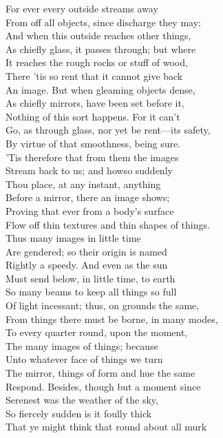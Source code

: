 For ever every outside streams away\\
From off all objects, since discharge they may;\\
And when this outside reaches other things,\\
As chiefly glass, it passes through; but where\\
It reaches the rough rocks or stuff of wood,\\
There 'tis so rent that it cannot give back\\
An image. But when gleaming objects dense,\\
As chiefly mirrors, have been set before it,\\
Nothing of this sort happens. For it can't\\
Go, as through glass, nor yet be rent—its safety,\\
By virtue of that smoothness, being sure.\\
'Tis therefore that from them the images\\
Stream back to us; and howso suddenly\\
Thou place, at any instant, anything\\
Before a mirror, there an image shows;\\
Proving that ever from a body's surface\\
Flow off thin textures and thin shapes of things.\\
Thus many images in little time\\
Are gendered; so their origin is named\\
Rightly a speedy. And even as the sun\\
Must send below, in little time, to earth\\
So many beams to keep all things so full\\
Of light incessant; thus, on grounds the same,\\
From things there must be borne, in many modes,\\
To every quarter round, upon the moment,\\
The many images of things; because\\
Unto whatever face of things we turn\\
The mirror, things of form and hue the same\\
Respond. Besides, though but a moment since\\
Serenest was the weather of the sky,\\
So fiercely sudden is it foully thick\\
That ye might think that round about all murk\\
